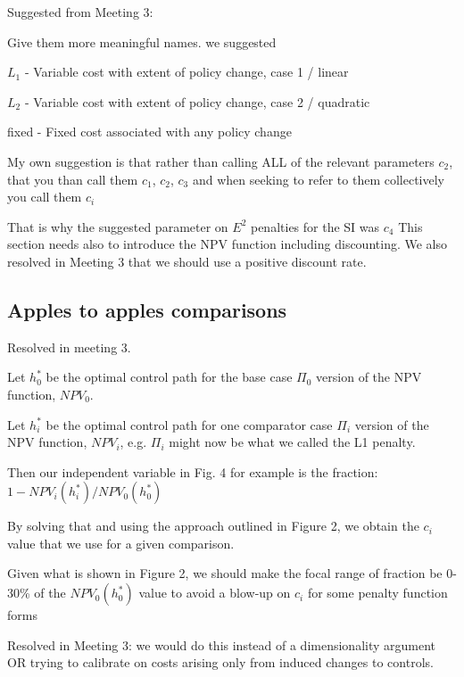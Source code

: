 \documentclass[authoryear, review, 12pt]{elsarticle}
\begin{document}
{\color{blue}
  Suggested from Meeting 3:

 Give them more meaningful names.   we suggested

$L_1$ - Variable cost with extent of policy change, case 1 / linear

$L_2$ - Variable cost with extent of policy change, case 2 / quadratic

fixed -  Fixed cost associated with any policy change

 My own suggestion is that rather than calling ALL of the relevant parameters $c_2$, that you than call them $c_1$, $c_2$, $c_3$ and when seeking to refer to them collectively you call them $c_i$

 That is why the suggested parameter on $E^2$ penalties for the SI was $c_4$  This section needs also to introduce the NPV function including discounting. We also resolved in Meeting 3 that we should use a positive discount rate.
}


\subsection{Apples to apples comparisons}


{\color{red}


Resolved in meeting 3.

Let $h_0^*$ be the optimal control path for the base case $\Pi_0$ version of the NPV function, $NPV_0$. 

Let $h_i^*$ be the optimal control path for one comparator case $\Pi_i$ version of the NPV function, $NPV_i$, e.g. $\Pi_i$ might now be what we called the L1 penalty.


Then our independent variable in Fig. 4 for example is the fraction: $1 - NPV_i(h_i^*) / NPV_0(h_0^*)$

By solving that and using the approach outlined in Figure 2, we obtain the $c_i$ value that we use for a given comparison.

Given what is shown in Figure 2, we should make the focal range of fraction be 0-30\% of the $NPV_0(h_0^*)$ value to avoid a blow-up on $c_i$ for some penalty function forms

Resolved in Meeting 3: we would do this instead of a dimensionality argument OR trying to calibrate on costs arising only from induced changes to controls.
}
\end{document}
